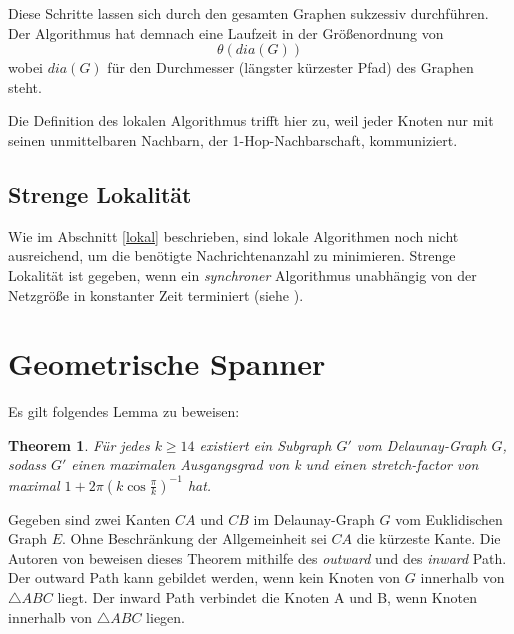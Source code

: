 \documentclass[a4paper,twoside]{IEEEtran}
\newtheorem{boundedSpannerTheorem}{Theorem}[section]
\begin{document}
Diese Schritte lassen sich durch den gesamten Graphen sukzessiv durchführen. 
Der Algorithmus hat demnach eine Laufzeit in der Größenordnung von 
\begin{equation*}
\theta (dia(G)) 
\end{equation*}
wobei $dia(G) $ für den Durchmesser (längster kürzester Pfad) des Graphen steht.

Die Definition des lokalen Algorithmus trifft hier zu, weil jeder Knoten nur mit seinen unmittelbaren Nachbarn, der 1-Hop-Nachbarschaft, kommuniziert.





\subsection{Strenge Lokalität}
Wie im Abschnitt \ref{lokal} beschrieben, sind lokale Algorithmen noch nicht ausreichend, um die benötigte Nachrichtenanzahl zu minimieren.
Strenge Lokalität ist gegeben, wenn ein \emph{synchroner} Algorithmus unabhängig von der Netzgröße in konstanter Zeit terminiert (siehe \cite{strictlyLocal}).




\section{Geometrische Spanner}

Es gilt folgendes Lemma zu beweisen:

\begin{boundedSpannerTheorem}
Für jedes $k \geq 14 $ existiert ein Subgraph $G' $ vom Delaunay-Graph $G $, sodass $G' $ einen maximalen Ausgangsgrad von k und einen stretch-factor von maximal $1+2\pi(k \cos{\frac{\pi}{k}})^{-1} $ hat.
\end{boundedSpannerTheorem}
Gegeben sind zwei Kanten $CA $ und $CB $ im Delaunay-Graph $G $ vom Euklidischen Graph $E $.
Ohne Beschränkung der Allgemeinheit sei $CA $ die kürzeste Kante.
Die Autoren von \cite{kanj} beweisen dieses Theorem mithilfe des \emph{outward} und des \emph{inward} Path. %
Der outward Path kann gebildet werden, wenn kein Knoten von $G $ innerhalb von $\triangle {ABC} $ liegt.
Der inward Path verbindet die Knoten A und B, wenn Knoten innerhalb von $\triangle {ABC} $ liegen.
\end{document}
